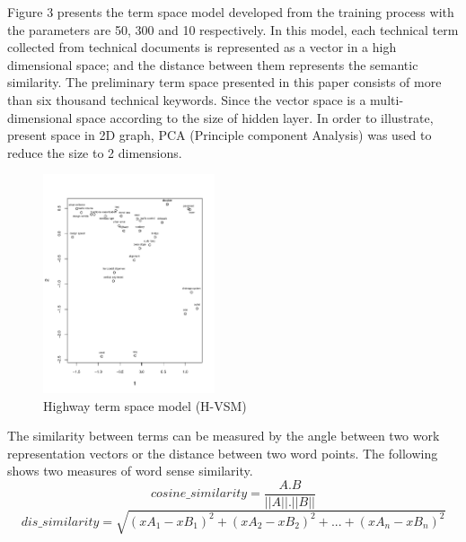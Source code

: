 \documentclass[Journal, InsideFigs, DoubleSpace]{ascelike} %
\begin{document}
%
Figure 3 presents the term space model developed from the training process with the parameters are 50, 300 and 10 respectively. In this model, each technical term collected from technical documents is represented as a vector in a high dimensional space; and the distance between them represents the semantic similarity. The preliminary term space presented in this paper consists of more than six thousand technical keywords. Since the vector space is a multi-dimensional space according to the size of hidden layer. In order to illustrate, present space in 2D graph, PCA (Principle component Analysis) was used to reduce the size to 2 dimensions. 
%
\begin{figure}[t]
	\centering
	\includegraphics[width=0.45\textwidth]{Rplot_space}
	\caption{Highway term space model (H-VSM)}
	\label{fig:hvsm}
\end{figure}

The similarity between terms can be measured by the angle between two work representation vectors or the distance between two word points. The following shows two measures of word sense similarity.
%
$$cosine\_similarity = \frac{A.B}{||A||.||B||}  $$
$$dis\_similarity =\sqrt{(xA_1-xB_1)^2+(xA_2-xB_2)^2+...+(xA_n-xB_n)^2} $$
\end{document}
